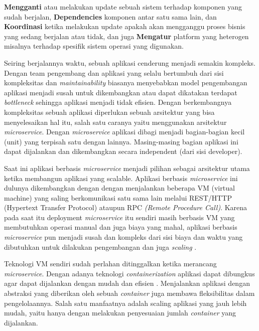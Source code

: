 \textbf{Mengganti} atau melakukan update sebuah sistem terhadap komponen yang sudah berjalan,
\textbf{Dependencies} komponen antar satu sama lain, dan
\textbf{Koordinasi} ketika melakukan update apakah akan mengganggu proses bisnis yang sedang berjalan atau tidak, dan juga
\textbf{Mengatur} platform yang heterogen misalnya terhadap spesifik sistem operasi yang digunakan.
\par
Seiring berjalannya waktu, sebuah aplikasi cenderung menjadi semakin  kompleks\cite{Tania2014, Newman2015}.
Dengan team pengembang dan aplikasi yang selalu bertumbuh  dari sisi kompleksitas dan \textit{maintainability} biasanya
menyebabkan model  pengembangan aplikasi menjadi susah untuk dikembangkan atau dapat dikatakan  terdapat \textit{bottleneck}
sehingga aplikasi menjadi tidak efisien\cite{Yale2016}. Dengan berkembangnya kompleksitas sebuah aplikasi diperlukan
sebuah arsitektur yang  bisa menyelesaikan hal itu, salah satu caranya yaitu menggunakan arsitektur \textit{microservice}\cite{Tania2014}.
Dengan \textit{microservice} aplikasi dibagi menjadi bagian-bagian kecil (unit) yang terpisah satu dengan lainnya\cite{Tania2014}.
Masing-masing bagian aplikasi ini  dapat dijalankan dan dikembangkan secara independent (dari sisi developer)\cite{Xiao2017}.
\par
Saat ini aplikasi berbasis \textit{microservice} menjadi pilihan sebagai arsitektur utama ketika
membangun aplikasi yang scalable\cite{Wu2014}. Aplikasi berbasis \textit{microservice} ini
dulunya dikembangkan dengan dengan menjalankan beberapa VM  (virtual machine)
yang saling berkomunikasi satu sama lain melalui REST/HTTP  (Hypertext Transfer Protocol)
ataupun RPC \textit{(Remote Procedure Call)}\cite{Khazaei2016}. Karena  pada saat itu deployment \textit{microservice} itu sendiri
masih berbasis VM yang  membutuhkan operasi manual dan juga biaya yang mahal, aplikasi berbasis
\textit{microservice} pun menjadi susah dan kompleks dari sisi biaya dan waktu yang  dibutuhkan untuk dilakukan
pengembangan dan juga \textit{scaling}\cite{Khazaei2016} .
\par
\newpage
Teknologi VM sendiri sudah perlahan ditinggalkan ketika merancang \textit{microservice}.
Dengan adanya teknologi \textit{containerization} aplikasi dapat dibungkus agar dapat dijalankan dengan mudah dan efisien \cite{Khazaei2016}.
Menjalankan aplikasi dengan  abstraksi yang diberikan oleh sebuah \textit{container} juga membawa fleksibilitas
dalam  pengelolaannya. Salah satu manfaatnya adalah scaling aplikasi yang jauh lebih  mudah, yaitu hanya
dengan melakukan penyesuaian jumlah \textit{container} yang  dijalankan\cite{Singh2017}.
